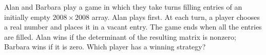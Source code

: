 Alan and Barbara play a game in which they take turns filling entries of
an initially empty $2008 \times 2008$ array. Alan plays first. At each
turn, a player chooses a real number and places it in a vacant entry.
The game ends when all the entries are filled. Alan wins if the
determinant of the resulting matrix is nonzero; Barbara wins if it is zero.
Which player has a winning strategy?
